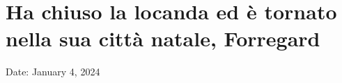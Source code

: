 \section{Ha chiuso la locanda ed è tornato nella sua città natale,
Forregard}\label{ha-chiuso-la-locanda-ed-uxe8-tornato-nella-sua-cittuxe0-natale-forregard}

Date: January 4, 2024
